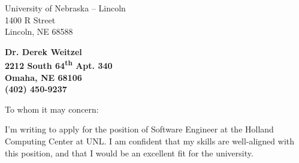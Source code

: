 \documentclass[11pt]{letter} %
\begin{document}
	
	
	\begin{letter}{University of Nebraska -- Lincoln \\
			1400 R Street \\
			Lincoln, NE 68588} 
		
		
		\begin{center}
			\large\bf Dr. Derek Weitzel \\ %
			2212 South 64\textsuperscript{th} Apt. 340 \\ Omaha, NE 68106 \\ (402) 450-9237 %
		\end{center} 
		\vfill
		
		\signature{Dr. Derek Weitzel} %
		
		
		\opening{To whom it may concern:} 
		
		
		I'm writing to apply for the position of Software Engineer at the Holland Computing Center at UNL. I am confident that my skills are well-aligned with this position, and that I would be an excellent fit for the university.
		
		

\end{letter}
\end{document}
